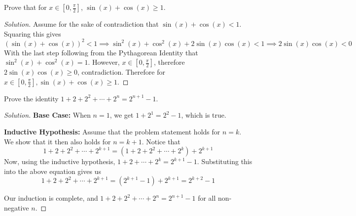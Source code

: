 \documentclass[12pt,openany]{book}
\theoremstyle{definition}
\newenvironment{soln}{\begin{proof}[Solution]}{\end{proof}}
\theoremstyle{definition}
\begin{document}
\begin{exmp}  Prove that for $x\in [0, \frac{\pi}{2}]$, $\sin(x)+\cos(x)\ge 1$.  \end{exmp}
\begin{soln}  Assume for the sake of contradiction that $\sin(x)+\cos(x)<1$.  Squaring this gives $$\left(\sin(x)+\cos(x)\right)^2<1\implies \sin^2(x)+\cos^2(x)+2\sin(x)\cos(x)<1\implies 2\sin(x)\cos(x)<0$$
With the last step following from the Pythagorean Identity that $\sin^2(x)+\cos^2(x)=1$.  However, $x\in [0, \frac{\pi}{2}]$, therefore $2\sin(x)\cos(x)\ge 0$, contradiction.  Therefore for $x\in [0, \frac{\pi}{2}], \sin(x)+\cos(x)\ge 1$.  \end{soln}  

\begin{exmp}  Prove the identity $1+2+2^2+\cdots +2^n=2^{n+1}-1$.  \end{exmp}
\begin{soln}  
\textbf{Base Case:}  When $n=1$, we get $1+2^1=2^{2}-1$, which is true.

\textbf{Inductive Hypothesis:}  Assume that the problem statement holds for $n=k$.  We show that it then also holds for $n=k+1$.
Notice that $$1+2+2^2+\cdots+2^{k+1}=\left(1+2+2^2+\cdots+2^k\right)+2^{k+1}$$
Now, using the inductive hypothesis, $1+2+\cdots+2^k=2^{k+1}-1$.  Substituting this into the above equation gives us $$1+2+2^2+\cdots+2^{k+1}=\left(2^{k+1}-1\right)+2^{k+1}=2^{k+2}-1$$

Our induction is complete, and $1+2+2^2+\cdots+2^n=2^{n+1}-1$ for all non-negative $n$.  \end{soln}
\end{document}
